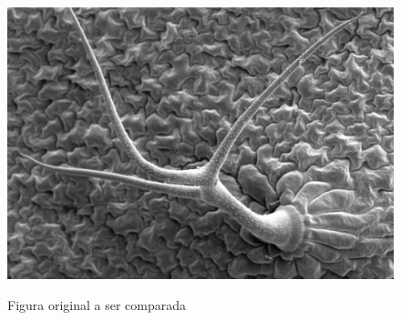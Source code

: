 \documentclass[10pt,a4paper]{article}
\begin{document}
\newpage
\begin{figure}[h!]
\begin{center}
\includegraphics[scale=0.35]{photos/m15_tricome}\label{fig3}
\caption{Figura original a ser comparada}
\end{center}
\end{figure}
\end{document}
